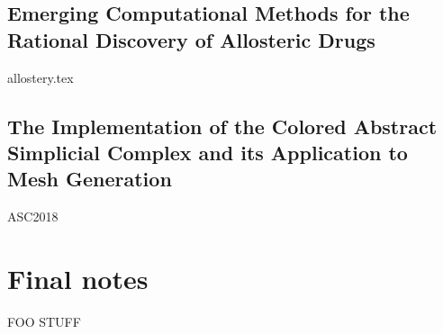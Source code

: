 \documentclass[11pt, chapterheads, final]{ucsd}
\theoremstyle{definition}
\begin{document}
\newpage
\begin{refsection}
\chapter{Emerging Computational Methods for the Rational Discovery of Allosteric Drugs}\label{chap:allostery}
{allostery.tex}
\printbibliography[segment=\therefsegment,heading=subbibintoc]{}
\end{refsection}


\newpage
\begin{refsection}
\chapter{The Implementation of the Colored Abstract Simplicial Complex and its Application to Mesh Generation}\label{chap:asc}
{ASC2018}
\printbibliography[segment=\therefsegment,heading=subbibintoc]{}
\end{refsection}

\appendix
\chapter{Final notes}
FOO STUFF

% 
\end{document}
